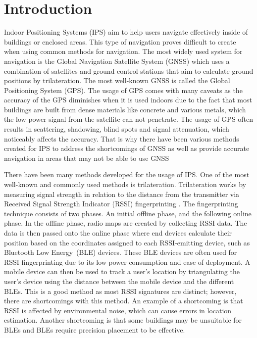 \documentclass[runningheads]{llncs}
\begin{document}
\section{Introduction}
\vspace{-10pt}
Indoor Positioning Systems (IPS) aim to help users navigate effectively inside of buildings or enclosed areas. This type of navigation proves difficult to create when using common methods for navigation. The most widely used system for navigation is the Global Navigation Satellite System (GNSS) which uses a combination of satellites and ground control stations that aim to calculate ground positions by trilateration. The most well-known GNSS is called the Global Positioning System (GPS). The usage of GPS comes with many caveats as the accuracy of the GPS diminishes when it is used indoors due to the fact that most buildings are built from dense materials like concrete and various metals, which the low power signal from the satellite can not penetrate. The usage of GPS often results in scattering, shadowing, blind spots and signal attenuation, which noticeably affects the accuracy\cite{bgp1}. That is why there have been various methods created for IPS to address the shortcomings of GNSS as well as provide accurate navigation in areas that may not be able to use GNSS

There have been many methods developed for the usage of IPS. One of the most well-known and commonly used methods is trilateration. Trilateration works by measuring signal strength in relation to the distance from the transmitter via Received Signal Strength Indicator (RSSI) fingerprinting \cite{bg2}. The fingerprinting technique consists of two phases. An initial offline phase, and the following online phase. In the offline phase, radio maps are created by collecting RSSI data. The data is then passed onto the online phase where end devices calculate their position based on the coordinates assigned to each RSSI-emitting device, such as Bluetooth Low Energy~(BLE) devices. These BLE devices are often used for RSSI fingerprinting due to its low power consumption and ease of deployment. A mobile device can then be used to track a user's location by triangulating the user's device using the distance between the mobile device and the different BLEs. This is a good method as most RSSI signatures are distinct; however, there are shortcomings with this method. An example of a shortcoming is that RSSI is affected by environmental noise, which can cause errors in location estimation\cite{bgp2}. Another shortcoming is that some buildings may be unsuitable for BLEs and BLEs require precision placement to be effective.
\end{document}
